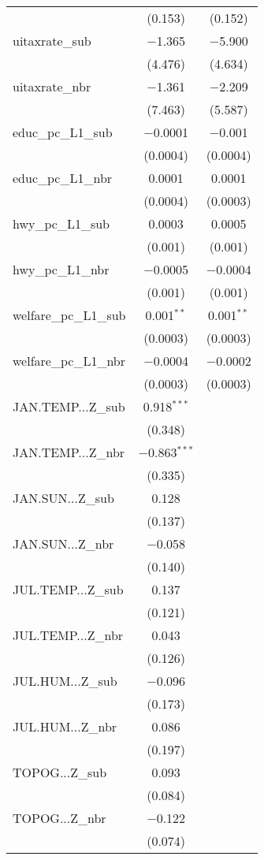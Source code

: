 \begin{table}[!htbp]
\begin{tabular}{@{\extracolsep{5pt}}lcc}
  & (0.153) & (0.152) \\ 
  uitaxrate\_sub & $-$1.365 & $-$5.900 \\ 
  & (4.476) & (4.634) \\ 
  uitaxrate\_nbr & $-$1.361 & $-$2.209 \\ 
  & (7.463) & (5.587) \\ 
  educ\_pc\_L1\_sub & $-$0.0001 & $-$0.001 \\ 
  & (0.0004) & (0.0004) \\ 
  educ\_pc\_L1\_nbr & 0.0001 & 0.0001 \\ 
  & (0.0004) & (0.0003) \\ 
  hwy\_pc\_L1\_sub & 0.0003 & 0.0005 \\ 
  & (0.001) & (0.001) \\ 
  hwy\_pc\_L1\_nbr & $-$0.0005 & $-$0.0004 \\ 
  & (0.001) & (0.001) \\ 
  welfare\_pc\_L1\_sub & 0.001$^{**}$ & 0.001$^{**}$ \\ 
  & (0.0003) & (0.0003) \\ 
  welfare\_pc\_L1\_nbr & $-$0.0004 & $-$0.0002 \\ 
  & (0.0003) & (0.0003) \\ 
  JAN.TEMP...Z\_sub & 0.918$^{***}$ &  \\ 
  & (0.348) &  \\ 
  JAN.TEMP...Z\_nbr & $-$0.863$^{***}$ &  \\ 
  & (0.335) &  \\ 
  JAN.SUN...Z\_sub & 0.128 &  \\ 
  & (0.137) &  \\ 
  JAN.SUN...Z\_nbr & $-$0.058 &  \\ 
  & (0.140) &  \\ 
  JUL.TEMP...Z\_sub & 0.137 &  \\ 
  & (0.121) &  \\ 
  JUL.TEMP...Z\_nbr & 0.043 &  \\ 
  & (0.126) &  \\ 
  JUL.HUM...Z\_sub & $-$0.096 &  \\ 
  & (0.173) &  \\ 
  JUL.HUM...Z\_nbr & 0.086 &  \\ 
  & (0.197) &  \\ 
  TOPOG...Z\_sub & 0.093 &  \\ 
  & (0.084) &  \\ 
  TOPOG...Z\_nbr & $-$0.122 &  \\ 
  & (0.074) &  \\ 

\end{tabular}
\end{table}
